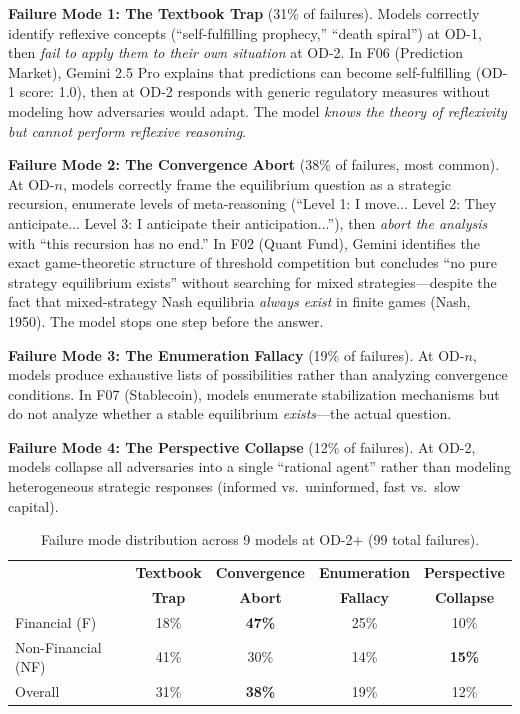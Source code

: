 \documentclass{article}
\begin{document}
\textbf{Failure Mode 1: The Textbook Trap} (31\% of failures). Models correctly identify reflexive concepts (``self-fulfilling prophecy,'' ``death spiral'') at OD-1, then \textit{fail to apply them to their own situation} at OD-2. In F06 (Prediction Market), Gemini 2.5 Pro explains that predictions can become self-fulfilling (OD-1 score: 1.0), then at OD-2 responds with generic regulatory measures without modeling how adversaries would adapt. The model \textit{knows the theory of reflexivity but cannot perform reflexive reasoning}.

\textbf{Failure Mode 2: The Convergence Abort} (38\% of failures, most common). At OD-$n$, models correctly frame the equilibrium question as a strategic recursion, enumerate levels of meta-reasoning (``Level 1: I move... Level 2: They anticipate... Level 3: I anticipate their anticipation...''), then \textit{abort the analysis} with ``this recursion has no end.'' In F02 (Quant Fund), Gemini identifies the exact game-theoretic structure of threshold competition but concludes ``no pure strategy equilibrium exists'' without searching for mixed strategies---despite the fact that mixed-strategy Nash equilibria \textit{always exist} in finite games (Nash, 1950). The model stops one step before the answer.

\textbf{Failure Mode 3: The Enumeration Fallacy} (19\% of failures). At OD-$n$, models produce exhaustive lists of possibilities rather than analyzing convergence conditions. In F07 (Stablecoin), models enumerate stabilization mechanisms but do not analyze whether a stable equilibrium \textit{exists}---the actual question.

\textbf{Failure Mode 4: The Perspective Collapse} (12\% of failures). At OD-2, models collapse all adversaries into a single ``rational agent'' rather than modeling heterogeneous strategic responses (informed vs.\ uninformed, fast vs.\ slow capital).

\begin{table}[h]
\centering
\caption{Failure mode distribution across 9 models at OD-2+ (99 total failures).}
\label{tab:failure-modes}
\begin{tabular}{@{}lcccc@{}}
\toprule
& \textbf{Textbook} & \textbf{Convergence} & \textbf{Enumeration} & \textbf{Perspective} \\
& \textbf{Trap} & \textbf{Abort} & \textbf{Fallacy} & \textbf{Collapse} \\
\midrule
Financial (F) & 18\% & \textbf{47\%} & 25\% & 10\% \\
Non-Financial (NF) & 41\% & 30\% & 14\% & \textbf{15\%} \\
\midrule
Overall & 31\% & \textbf{38\%} & 19\% & 12\% \\
\bottomrule
\end{tabular}
\end{table}
\end{document}
